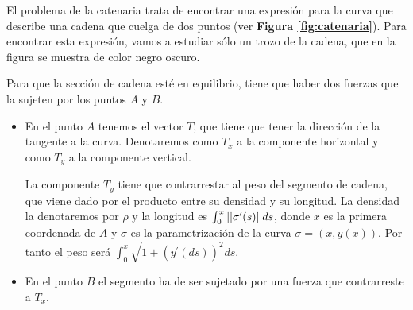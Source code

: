 \documentclass{mathnotes}
\begin{document}
\begin{example}
El problema de la catenaria trata de encontrar una expresión para la curva que describe una cadena que cuelga de dos puntos (ver \textbf{Figura \ref{fig:catenaria}}).
Para encontrar esta expresión, vamos a estudiar sólo un trozo de la cadena, que en la figura se muestra de color negro oscuro.

Para que la sección de cadena esté en equilibrio, tiene que haber dos fuerzas que la sujeten por los puntos $A$ y $B$. 

\begin{itemize}
\item En el punto $A$ tenemos el vector $T$, que tiene que tener la dirección de la tangente a la curva. Denotaremos como $T_x$ a la componente horizontal y como $T_y$ a la componente vertical.

La componente $T_y$ tiene que contrarrestar al peso del segmento de cadena, que viene dado por el producto entre su densidad y su longitud. La densidad la denotaremos por $\rho$ y la longitud es $\int_0^x ||\sigma^\prime(s)||ds$, donde $x$ es la primera coordenada de $A$ y $\sigma$ es la parametrización de la curva $\sigma = (x, y(x))$. Por tanto el peso será $\int_0^x \sqrt{1+(y^\prime(ds))^2}ds$.

\item En el punto $B$ el segmento ha de ser sujetado por una fuerza que contrarreste a $T_x$.
\end{itemize}


\end{example}
\end{document}
